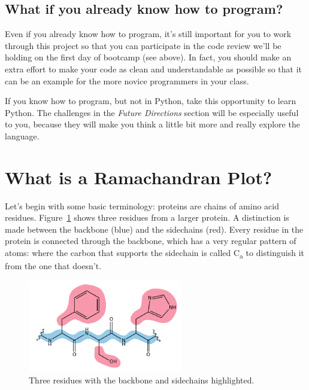 \documentclass{article}
\newcommand{\calpha}{C\textsubscript{\textgreek{a}}}
\begin{document}
\subsection{What if you already know how to program?}

Even if you already know how to program, it's still important for you to work 
through this project so that you can participate in the code review we'll be 
holding on the first day of bootcamp (see above).  In fact, you should make an 
extra effort to make your code as clean and understandable as possible so that it 
can be an example for the more novice programmers in your class.

If you know how to program, but not in Python, take this opportunity to learn 
Python.  The challenges in the \emph{Future Directions} section will be 
especially useful to you, because they will make you think a little bit more 
and really explore the language.

\section{What is a Ramachandran Plot?}

Let's begin with some basic terminology: proteins are chains of amino acid 
residues.  Figure~\ref{fig:three-residues} shows three residues from a larger 
protein.  A distinction is made between the backbone (blue) and the sidechains 
(red).  Every residue in the protein is connected through the backbone, which 
has a very regular pattern of atoms:  where the carbon that supports the sidechain is 
called \calpha{} to distinguish it from the one that doesn't.

\begin{figure}[h]
 \centering
 \includegraphics[width=0.60\textwidth]{three-residues}
 \caption{Three residues with the backbone and sidechains highlighted.}
 \label{fig:three-residues}
\end{figure}
\end{document}
